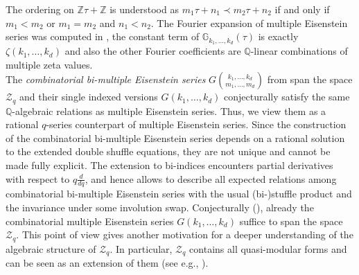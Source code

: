 \documentclass[12pt,reqno]{amsart}
\numberwithin{equation}{section}
\theoremstyle{definition}
\newcommand{\ZZ}{\mathbb{Z}}
\newcommand{\QQ}{\mathbb{Q}}
\newcommand{\Z}{\mathcal{Z}}
\begin{document}
The ordering on $\ZZ\tau+\ZZ$ is understood as $m_1\tau+n_1 \prec m_2\tau+n_2$ if and only if $m_1< m_2$ or $m_1=m_2$ and $n_1<n_2$. The Fourier expansion of multiple Eisenstein series was computed in \cite{Ba12}, the constant term of $\mathbb{G}_{k_1,\ldots,k_d}(\tau)$ is exactly $\zeta(k_1,\ldots,k_d)$ and also the other Fourier coefficients are $\QQ$-linear combinations of multiple zeta values.
\\ 
The \emph{combinatorial bi-multiple Eisenstein series}  $G\binom{k_1,\ldots,k_d}{m_1,\ldots,m_d}$ from \cite{BB23} span the space $\Z_q$ and their single indexed versions $G(k_1,\ldots,k_d)$ conjecturally satisfy the same $\QQ$-algebraic relations as multiple Eisenstein series. Thus, we view them as a rational $q$-series counterpart of multiple Eisenstein series. Since the construction of the combinatorial bi-multiple Eisenstein series depends on a rational solution to the extended double shuffle equations, they are not unique and cannot be made fully explicit. The extension to bi-indices encounters partial derivatives with respect to $q\frac{d}{dq}$, and hence allows to describe all expected relations among combinatorial bi-multiple Eisenstein series with the usual (bi-)stuffle product and the invariance under some involution swap. Conjecturally (\cite[Remark 6.11]{BB23}), already the combinatorial multiple Eisenstein series $G(k_1,\ldots,k_d)$ suffice to span the space $\Z_q$. This point of view gives another motivation for a deeper understanding of the algebraic structure of $\Z_q$. In particular, $\Z_q$ contains all quasi-modular forms and can be seen as an extension of them (see e.g., \cite{BI24}).
\end{document}
